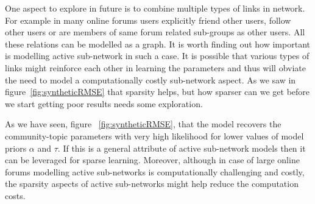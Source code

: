 \documentclass{sig-alternate}
\begin{document}
One aspect to explore in future is to combine multiple types of links in
network. For example in many online forums users explicitly friend other users,
follow other users or are members of same forum related sub-groups as other
users. All these relations can be modelled as a graph. It is worth finding out
how important is modelling active sub-network in such a case. It is
possible that various types of links might reinforce each other in learning
the parameters and thus will obviate the need to model a computationally
costly sub-network aspect. As we saw in figure~\ref{fig:syntheticRMSE} that
sparsity helps, but how sparser can we get before we start getting poor results
needs some exploration.

As we have
seen, figure ~\ref{fig:syntheticRMSE}, that the model recovers the
community-topic parameters with very high likelihood for lower values of model
priors $\alpha$ and $\tau$. If this is a general attribute of active sub-network
models then it can be leveraged for sparse learning. Moreover, although in case
of large online forums modelling active sub-networks is computationally
challenging and costly, the sparsity aspects of active sub-networks might help
reduce the computation costs.




\appendix

\end{document}
